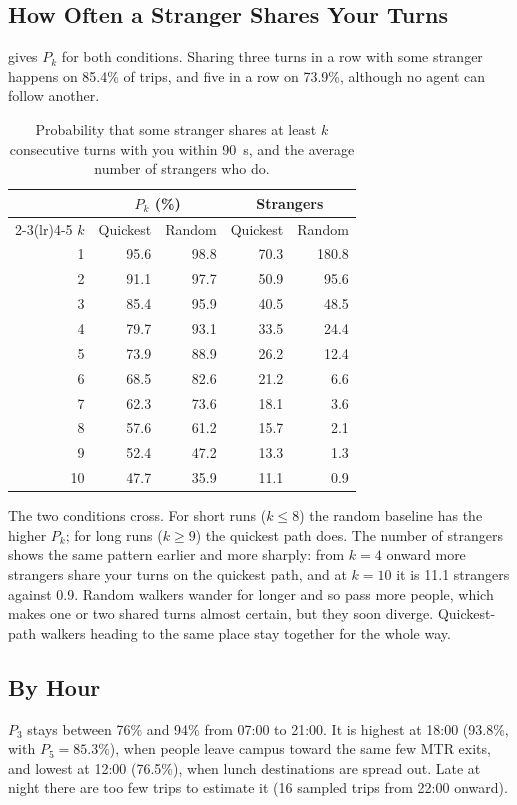 \documentclass[9pt]{ieeeconf}
\begin{document}
\subsection{How Often a Stranger Shares Your Turns}
 gives $P_k$ for both conditions. Sharing three turns in a row with some stranger happens on 85.4\% of trips, and five in a row on 73.9\%, although no agent can follow another.

\begin{table}[t]
\centering
\caption{Probability that some stranger shares at least $k$ consecutive turns with you within \SI{90}{\second}, and the average number of strangers who do.}
\label{tab:shared}
\begin{tabular}{rrrrr}
\toprule
 & \multicolumn{2}{c}{$P_k$ (\%)} & \multicolumn{2}{c}{Strangers} \\
\cmidrule(lr){2-3}\cmidrule(lr){4-5}
$k$ & Quickest & Random & Quickest & Random \\
\midrule
1  & 95.6 & 98.8 & 70.3 & 180.8 \\
2  & 91.1 & 97.7 & 50.9 & 95.6 \\
3  & 85.4 & 95.9 & 40.5 & 48.5 \\
4  & 79.7 & 93.1 & 33.5 & 24.4 \\
5  & 73.9 & 88.9 & 26.2 & 12.4 \\
6  & 68.5 & 82.6 & 21.2 & 6.6 \\
7  & 62.3 & 73.6 & 18.1 & 3.6 \\
8  & 57.6 & 61.2 & 15.7 & 2.1 \\
9  & 52.4 & 47.2 & 13.3 & 1.3 \\
10 & 47.7 & 35.9 & 11.1 & 0.9 \\
\bottomrule
\end{tabular}
\end{table}

The two conditions cross. For short runs ($k \le 8$) the random baseline has the higher $P_k$; for long runs ($k \ge 9$) the quickest path does. The number of strangers shows the same pattern earlier and more sharply: from $k=4$ onward more strangers share your turns on the quickest path, and at $k=10$ it is 11.1 strangers against 0.9. Random walkers wander for longer and so pass more people, which makes one or two shared turns almost certain, but they soon diverge. Quickest-path walkers heading to the same place stay together for the whole way.

\subsection{By Hour}
$P_3$ stays between 76\% and 94\% from 07:00 to 21:00. It is highest at 18:00 (93.8\%, with $P_5 = 85.3\%$), when people leave campus toward the same few MTR exits, and lowest at 12:00 (76.5\%), when lunch destinations are spread out. Late at night there are too few trips to estimate it (16 sampled trips from 22:00 onward).
\end{document}
